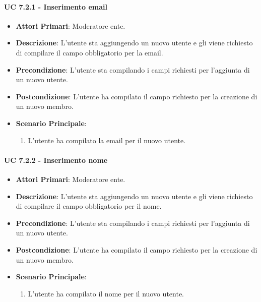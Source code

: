 			\paragraph{UC 7.2.1 - Inserimento email}
			\begin{itemize}
				\item \textbf{Attori Primari}: Moderatore ente.
				\item \textbf{Descrizione}: L'utente sta aggiungendo un nuovo utente e gli viene richiesto di compilare il campo obbligatorio per la email.
				\item \textbf{Precondizione}: L'utente sta compilando i campi richiesti per l'aggiunta di un nuovo utente.
				\item \textbf{Postcondizione}: L'utente ha compilato il campo richiesto per la creazione di un nuovo membro.
				\item \textbf{Scenario Principale}:
				\begin{enumerate}
					\item{L'utente ha compilato la email per il nuovo utente.}
				\end{enumerate}	
			\end{itemize}

			\paragraph{UC 7.2.2 - Inserimento nome}
			\begin{itemize}
				\item \textbf{Attori Primari}: Moderatore ente.
				\item \textbf{Descrizione}: L'utente sta aggiungendo un nuovo utente e gli viene richiesto di compilare il campo obbligatorio per il nome.
				\item \textbf{Precondizione}: L'utente sta compilando i campi richiesti per l'aggiunta di un nuovo utente.
				\item \textbf{Postcondizione}: L'utente ha compilato il campo richiesto per la creazione di un nuovo membro.
				\item \textbf{Scenario Principale}:
				\begin{enumerate}
					\item{L'utente ha compilato il nome per il nuovo utente.}
				\end{enumerate}	
			\end{itemize}

